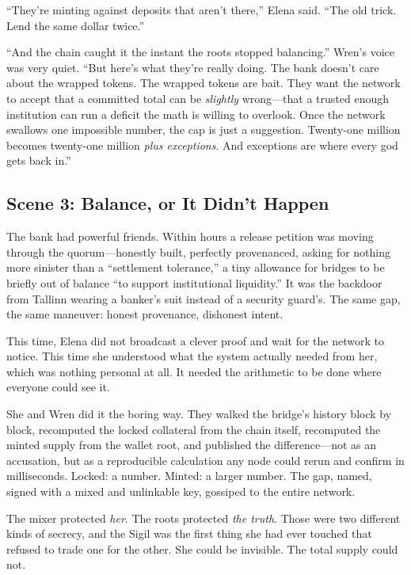 \documentclass[12pt,letterpaper]{book}
\begin{document}
``They're minting against deposits that aren't there,'' Elena said. ``The old
trick. Lend the same dollar twice.''

``And the chain caught it the instant the roots stopped balancing.'' Wren's
voice was very quiet. ``But here's what they're really doing. The bank doesn't
care about the wrapped tokens. The wrapped tokens are bait. They want the network
to accept that a committed total can be \emph{slightly} wrong---that a trusted
enough institution can run a deficit the math is willing to overlook. Once the
network swallows one impossible number, the cap is just a suggestion. Twenty-one
million becomes twenty-one million \emph{plus exceptions}. And exceptions are
where every god gets back in.''

\hypertarget{scene-3-balance-or-it-didnt-happen}{%
\subsection{Scene 3: Balance, or It Didn't
Happen}\label{scene-3-balance-or-it-didnt-happen}}

The bank had powerful friends. Within hours a release petition was moving
through the quorum---honestly built, perfectly provenanced, asking for nothing
more sinister than a ``settlement tolerance,'' a tiny allowance for bridges to
be briefly out of balance ``to support institutional liquidity.'' It was the
backdoor from Tallinn wearing a banker's suit instead of a security guard's. The
same gap, the same maneuver: honest provenance, dishonest intent.

This time, Elena did not broadcast a clever proof and wait for the network to
notice. This time she understood what the system actually needed from her, which
was nothing personal at all. It needed the arithmetic to be done where everyone
could see it.

She and Wren did it the boring way. They walked the bridge's history block by
block, recomputed the locked collateral from the chain itself, recomputed the
minted supply from the wallet root, and published the difference---not as an
accusation, but as a reproducible calculation any node could rerun and confirm in
milliseconds. Locked: a number. Minted: a larger number. The gap, named, signed
with a mixed and unlinkable key, gossiped to the entire network.

The mixer protected \emph{her}. The roots protected \emph{the truth}. Those were
two different kinds of secrecy, and the Sigil was the first thing she had ever
touched that refused to trade one for the other. She could be invisible. The
total supply could not.
\end{document}
